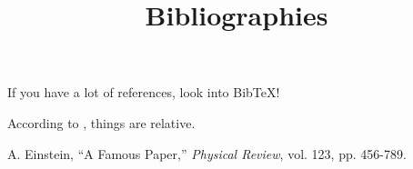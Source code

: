 \documentclass{article}
\title{Bibliographies}
\begin{document}
\maketitle

If you have a lot of references, look into BibTeX!

According to \cite{Einstein}, things are relative.

\begin{thebibliography}{1}

 A. Einstein, ``A Famous Paper,'' \textit{Physical Review}, vol. 123, pp. 456-789.

\end{thebibliography}
\end{document}

